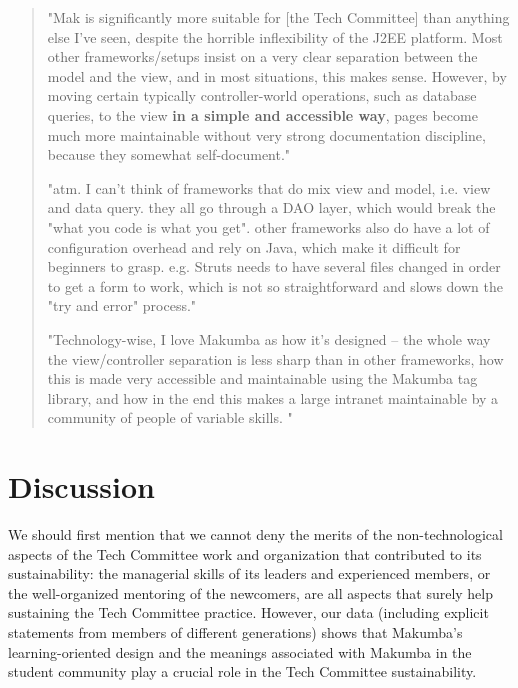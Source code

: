 \documentclass{sig-alt-release2}
\begin{document}
\begin{quotation}
	"Mak is significantly more suitable for [the Tech Committee] than anything else I've seen, despite the horrible inflexibility of the J2EE platform. Most other frameworks/setups insist on a very clear separation between the model and the view, and in most situations, this makes sense. However, by moving certain typically controller-world operations, such as database queries, to the view \textbf{in a simple and accessible way}, pages become much more maintainable without very strong documentation discipline, because they somewhat self-document."

	"atm. I can't think of frameworks that do mix view and model, i.e. view and data query. they all go through a DAO layer, which would break the "what you code is what you get". other frameworks also do have a lot of configuration overhead and rely on Java, which make it difficult for beginners to grasp. e.g. Struts needs to have several files changed in order to get a form to work, which is not so straightforward and slows down the "try and error" process." 
	
	"Technology-wise, I love Makumba as how it's designed -- the whole way the view/controller separation is less sharp than in other frameworks, how this is made very accessible and maintainable using the Makumba tag library, and how in the end this makes a large intranet maintainable by a community of people of variable skills. "

\end{quotation}

\section{Discussion}\label{sec:disco}
We should first mention that we cannot deny the merits of the non-technological aspects of the Tech Committee work and organization that contributed to its sustainability: the managerial skills of its leaders and experienced members, or the well-organized mentoring of the newcomers, are all aspects that surely help sustaining the Tech Committee practice. However, our data (including explicit statements from members of different generations) shows that Makumba's learning-oriented design and the meanings associated with Makumba in the student community play a crucial role in the Tech Committee sustainability.
\end{document}
